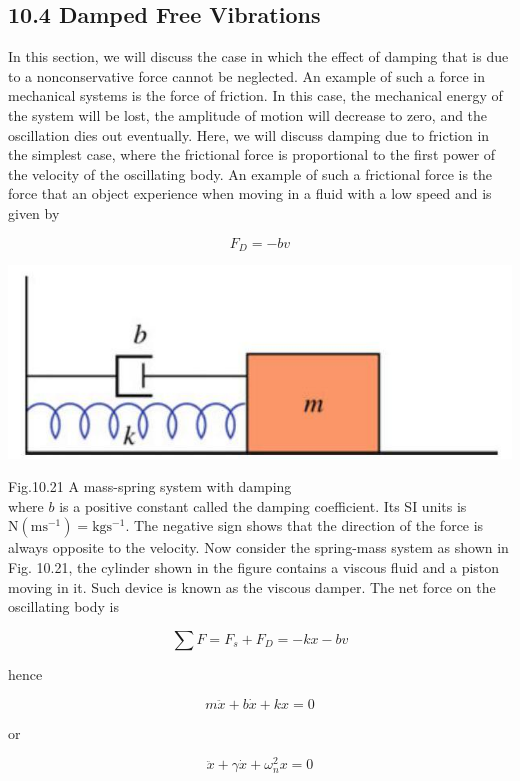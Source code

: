\documentclass[10pt]{article}
\begin{document}
\subsection*{10.4 Damped Free Vibrations}
In this section, we will discuss the case in which the effect of damping that is due to a nonconservative force cannot be neglected. An example of such a force in mechanical systems is the force of friction. In this case, the mechanical energy of the system will be lost, the amplitude of motion will decrease to zero, and the oscillation dies out eventually. Here, we will discuss damping due to friction in the simplest case, where the frictional force is proportional to the first power of the velocity of the oscillating body. An example of such a frictional force is the force that an object experience when moving in a fluid with a low speed and is given by

$$
F_{D}=-b v
$$

\begin{center}
\includegraphics[max width=\textwidth]{2024_09_13_db1f357d2aad0a03eb2eg-173}
\end{center}

Fig.10.21 A mass-spring system with damping\\
where $b$ is a positive constant called the damping coefficient. Its SI units is $\mathrm{N}\left(\mathrm{m} \mathrm{s}^{-1}\right)=\mathrm{kg} \mathrm{s}^{-1}$. The negative sign shows that the direction of the force is always opposite to the velocity. Now consider the spring-mass system as shown in Fig. 10.21, the cylinder shown in the figure contains a viscous fluid and a piston moving in it. Such device is known as the viscous damper. The net force on the oscillating body is

$$
\sum F=F_{s}+F_{D}=-k x-b v
$$

hence

$$
m \ddot{x}+b \dot{x}+k x=0
$$

or


\begin{equation*}
\ddot{x}+\gamma \dot{x}+\omega_{n}^{2} x=0 \tag{10.13}
\end{equation*}
\end{document}
